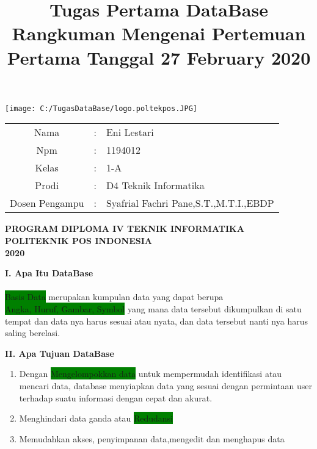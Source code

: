 \documentclass[a4paper,12pt]{article}
\title{\large{\textbf{Tugas Pertama DataBase}\\}Rangkuman Mengenai Pertemuan Pertama Tanggal 27 February 2020}
\date{}
\newcommand{\hilight}[1]{\colorbox{green} {#1}}
\begin{document}
\maketitle
\begin{center}
    \texttt{[image: C:/TugasDataBase/logo.poltekpos.JPG]}
\end{center}
\vspace{-0.1cm}
\begin{center}
\begin{tabular}{ c c l }

  Nama & : & Eni Lestari \\
  Npm & : & 1194012 \\
  Kelas & : & 1-A \\
  Prodi & : & D4 Teknik Informatika \\
  Dosen Pengampu & : & Syafrial Fachri Pane,S.T.,M.T.I.,EBDP

\end{tabular}
\vfill
\textbf{PROGRAM DIPLOMA IV TEKNIK INFORMATIKA}\\
\textbf{POLITEKNIK POS INDONESIA}\\
\textbf{2020}\\
\end{center} 

\newpage 

	\textbf{I. Apa Itu DataBase}
	\vspace{-0.3cm}
	\paragraph{}
			\hilight{Basis Data} merupakan kumpulan data yang dapat berupa \\ \hilight{Angka, Huruf, Gambar, Symbol} yang mana data tersebut dikumpulkan di satu tempat dan data nya harus sesuai atau nyata, dan data tersebut nanti nya harus saling berelasi.
			
	\vspace{0.8cm}
	\textbf{II. Apa Tujuan DataBase}
	\begin{enumerate}
			\item Dengan \hilight{Mengelompokkan data} untuk mempermudah identifikasi atau mencari data, database menyiapkan data yang sesuai dengan permintaan user terhadap suatu informasi dengan cepat dan akurat. 
			\item Menghindari data ganda atau \hilight {Redudansi}
			\item Memudahkan akses, penyimpanan data,mengedit dan menghapus data 
	\end{enumerate}
	\vspace{0.8cm}
\end{document}
